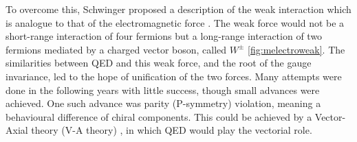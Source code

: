 To overcome this, Schwinger proposed a description of the weak interaction which is analogue to that of the electromagnetic force \cite{SCHWINGER1957407}. The weak force would not be a short-range interaction of four fermions but a long-range interaction of two fermions mediated by a charged vector boson, called $W^{\pm}$ \ref{fig:melectroweak}. The similarities between QED and this weak force, and the root of the gauge invariance, led to the hope of unification of the two forces. Many attempts were done in the following years with little success, though small advances were achieved. One such advance was parity (P-symmetry) violation, meaning a behavioural difference of chiral components. This could be achieved by a Vector-Axial theory (V-A theory) \cite{PhysRev.109.193,PhysRev.109.1860.2}, in which QED would play the vectorial role.

